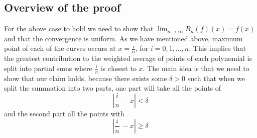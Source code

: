 \documentclass{article}
\begin{document}
\subsection{Overview of the proof}
For the above case to hold we need to show that $\lim_{n \rightarrow{\infty} }B_n(f)(x)=f(x)$ and that the convergence is uniform. As we have mentioned above, maximum point of each of the curves occurs at $x=\frac{i}{n}$, for $i=0,1,…,n$. This implies that the greatest contribution to the weighted average of points of each polynomial is split into partial sums where $\frac{i}{n}$ is closest to $x$. The main idea is that we need to show that our claim holds, because there exists some $\delta>0$ such that when we split the summation into two parts, one part will take all the points of
\begin{equation}
\left|\frac{i}{n}\ - x\right|< \delta    
\end{equation}
 and the second part all the points with 
 \begin{equation}
  \left|\frac{i}{n}\ - x\right|\geq \delta   
 \end{equation}
\end{document}
